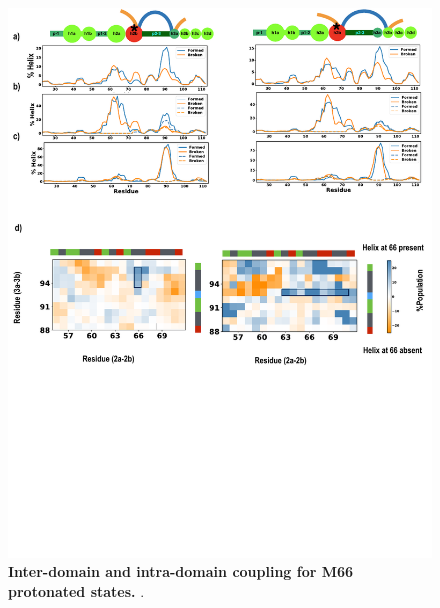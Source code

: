 \documentclass[journal=jacsat,manuscript=article]{achemso}
\begin{document}
\begin{figure}[!ht]
 \includegraphics[scale=0.5,width=\textwidth,trim={0 0cm 0 0},clip]{../figures/S11.pdf}
\caption{{\bf Inter-domain and intra-domain coupling for M66 protonated states.}
.
 }
\label{S11} 
\end{figure}
\end{document}
